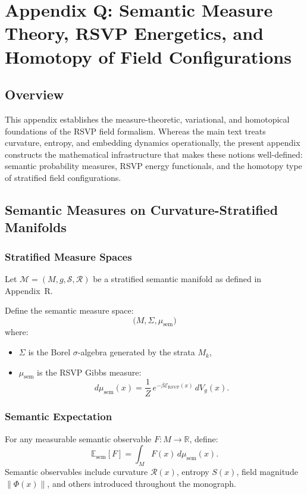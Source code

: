 \chapter*{Appendix Q: Semantic Measure Theory, RSVP Energetics, and Homotopy of Field Configurations}

\section{Overview}

This appendix establishes the measure-theoretic, variational, and homotopical foundations of the RSVP field formalism. Whereas the main text treats curvature, entropy, and embedding dynamics operationally, the present appendix constructs the mathematical infrastructure that makes these notions well-defined: semantic probability measures, RSVP energy functionals, and the homotopy type of stratified field configurations.

\section{Semantic Measures on Curvature-Stratified Manifolds}

\subsection{Stratified Measure Spaces}

Let $\mathcal{M} = (M,g,\mathcal{S},\mathcal{R})$ be a stratified semantic manifold as defined in Appendix~R.

Define the semantic measure space:
\[
\bigl(M,\Sigma,\mu_{\mathrm{sem}}\bigr)
\]
where:
\begin{itemize}
\item $\Sigma$ is the Borel $\sigma$-algebra generated by the strata $M_k$,
\item $\mu_{\mathrm{sem}}$ is the RSVP Gibbs measure:
\[
d\mu_{\mathrm{sem}}(x) = \frac{1}{Z}\,e^{-\beta\mathcal{E}_{\mathrm{RSVP}}(x)}\, dV_g(x).
\]
\end{itemize}

\subsection{Semantic Expectation}

For any measurable semantic observable $F : M \to \mathbb{R}$, define:
\[
\mathbb{E}_{\mathrm{sem}}[F] = \int_M F(x)\,d\mu_{\mathrm{sem}}(x).
\]
Semantic observables include curvature $\mathcal{R}(x)$, entropy $S(x)$, field magnitude $\|\Phi(x)\|$, and others introduced throughout the monograph.

